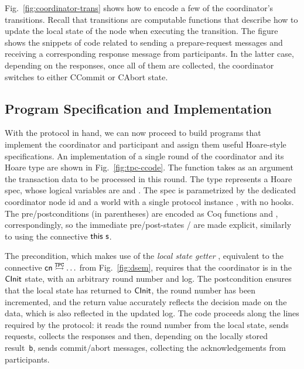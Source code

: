 Fig.~\ref{fig:coordinator-trans} shows how to encode a few of the
coordinator's transitions.
%
Recall that \disel transitions are computable functions that describe
how to update the local state of the node when executing the
transition.
%
The figure shows the snippets of \disel code related to sending a
prepare-request messages and receiving a corresponding response
message from participants.
%
In the latter case, depending on the responses, once all of them are
collected, the coordinator switches to either \textsf{CCommit} or
\textsf{CAbort} state.


\subsection{Program Specification and Implementation}
\label{sec:tpc-impl}

With the protocol in hand, we can now proceed to build programs that
implement the coordinator and participant and assign them useful
Hoare-style specifications.
%
An implementation of a single round of the coordinator and its Hoare
type are shown in Fig.~\ref{fig:tpc-ccode}.
%
The function  takes as an argument the
transaction data to be processed in this round.
%
The type  represents a Hoare
spec, whose logical variables are  and . The spec is
parametrized by the dedicated coordinator node id  and a
world with a single protocol instance , with no hooks.
%
The pre/postconditions (in parentheses) are encoded as Coq functions
 and , correspondingly, so
the immediate pre/post-states / are made explicit,
similarly to using the connective $\mathsf{this}~{\mathsf{s}}$.

The precondition, which makes use of the \emph{local state getter}
, equivalent to the connective
$\mathsf{cn} \ppts{\mathtt{TPC}} \ldots$ from Fig.~\ref{fig:dsem},
requires that the coordinator is in the $\mathsf{CInit}$ state, with an
arbitrary round number and log.
%
The postcondition ensures that the local state has returned to
$\mathsf{CInit}$, the round number has been incremented, and the return value
accurately reflects the decision made on the data, which is also
reflected in the updated log.
%
The code proceeds along the lines required by the protocol: it reads
the round number from the local state, sends requests, collects the
responses and then, depending on the locally stored result~\texttt{b},
sends commit/abort messages, collecting the acknowledgements from
participants.

